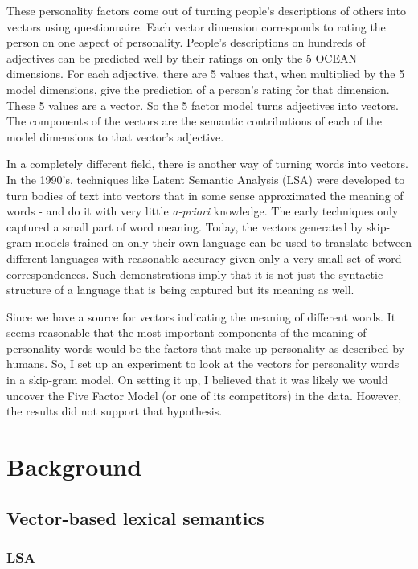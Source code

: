 \documentclass[10pt,letterpaper]{book}
\begin{document}
These personality factors come out of turning people's descriptions of others into vectors using questionnaire. Each vector dimension corresponds to rating the person on one aspect of personality. People's descriptions on hundreds of adjectives can be predicted well by their ratings on only the 5 OCEAN dimensions. For each adjective, there are 5 values that, when multiplied by the 5 model dimensions, give the prediction of a person's rating for that dimension. These 5 values are a vector. So the 5 factor model turns adjectives into vectors. The components of the vectors are the semantic contributions of each of the model dimensions to that vector's adjective.

In a completely different field, there is another way of turning words into vectors. In the 1990's, techniques like Latent Semantic Analysis (LSA) were developed to turn bodies of text into vectors that in some sense approximated the meaning of words - and do it with very little \textit{a-priori} knowledge. The early techniques only captured a small part of word meaning. Today, the vectors generated by skip-gram models trained on only their own language can be used to translate between different languages with reasonable accuracy given only a very small set of word correspondences. Such demonstrations imply that it is not just the syntactic structure of a language that is being captured but its meaning as well.

Since we have a source for vectors indicating the meaning of different words. It seems reasonable that the most important components of the meaning of personality words would be the factors that make up personality as described by humans. So, I set up an experiment to look at the vectors for personality words in a skip-gram model. On setting it up, I believed that it was likely we would uncover the Five Factor Model (or one of its competitors) in the data. However, the results did not support that hypothesis.

\chapter{Background}

\section{Vector-based lexical semantics}

\subsection{LSA}
\end{document}
